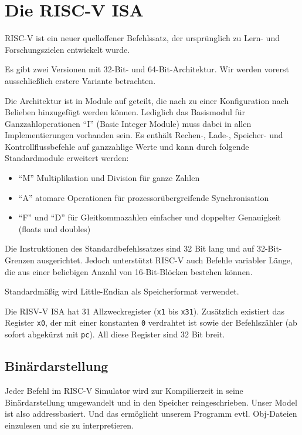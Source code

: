 \section{Die RISC-V ISA}

RISC-V ist ein neuer quelloffener Befehlssatz, der
ursprünglich zu Lern- und Forschungszielen entwickelt wurde.

Es gibt zwei Versionen mit 32-Bit- und 64-Bit-Architektur. Wir werden
vorerst ausschließlich erstere Variante betrachten.

Die Architektur ist in Module auf geteilt, die nach zu einer Konfiguration nach Belieben hinzugefügt werden können.
Lediglich das Basismodul für Ganzzahloperationen ``I'' (Basic Integer Module) muss dabei in allen Implementierungen vorhanden sein.
Es enthält Rechen-, Lade-, Speicher- und Kontrollflussbefehle auf ganzzahlige Werte und kann durch folgende
Standardmodule erweitert werden:

\begin{itemize}
\item ``M'' Multiplikation und Division für ganze Zahlen
\item ``A'' atomare Operationen für prozessorübergreifende Synchronisation
\item ``F'' und ``D'' für Gleitkommazahlen einfacher und doppelter Genauigkeit (floats und doubles)
\end{itemize}

Die Instruktionen des Standardbefehlssatzes sind 32 Bit lang und auf
32-Bit-Grenzen ausgerichtet. Jedoch unterstützt RISC-V auch Befehle variabler Länge, die
aus einer beliebigen Anzahl von 16-Bit-Blöcken bestehen können.

Standardmäßig wird Little-Endian als Speicherformat verwendet.

Die RISV-V ISA hat 31 Allzweckregister (\lstinline[style=risc-v_Assembler]!x1! bis \lstinline[style=risc-v_Assembler]!x31!). Zusätzlich existiert das Register \lstinline[style=risc-v_Assembler]!x0!, der mit einer konstanten \lstinline[style=risc-v_Assembler]!0! verdrahtet ist sowie der Befehlszähler (ab sofort abgekürzt mit \lstinline[style=risc-v_Assembler]!pc!). All diese Register sind 32 Bit breit.

\subsection{Binärdarstellung}

Jeder Befehl im RISC-V Simulator wird zur Kompilierzeit in seine
Binärdarstellung umgewandelt und in den Speicher reingeschrieben. Unser Model
ist also addressbasiert. Und das ermöglicht unserem Programm evtl. Obj-Dateien
einzulesen und sie zu interpretieren.

